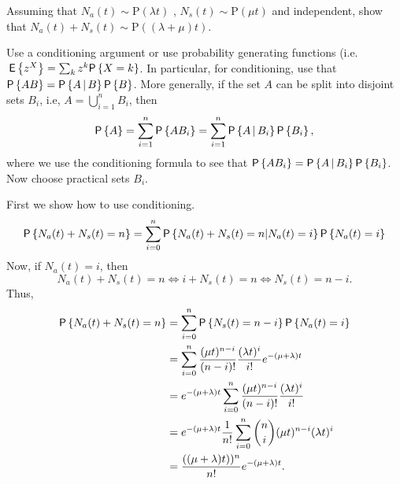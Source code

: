 \begin{question} 
 Assuming that
  $N_a(t)\sim \text{P}(\lambda t)$ , $N_s(t) \sim \text{P}(\mu t)$ and
  independent, show that
  $N_a(t) + N_s(t) \sim \text{P}((\lambda + \mu)t)$. 
  \begin{hint}
Use a conditioning argument or use probability generating
    functions (i.e. $\E{z^X}=\sum_k z^k \P{X=k}$. In particular, for
    conditioning, use that $\P{AB} = \P{A\given B}\P{B}$. More
    generally, if the set $A$ can be split into disjoint sets $B_i$,
    i.e, $A=\bigcup_{i=1}^n B_i$, then
    \begin{equation*}
      \P{A} = \sum_{i=1}^n \P{A B_i} = \sum_{i=1}^n \P{A\given B_i} \P{B_i},
    \end{equation*}
    where we use the conditioning formula to see that
    $\P{A B_i} = \P{A \given B_i} \P{B_i}$.  Now choose practical sets
    $B_i$.  
  \end{hint}

    \begin{solution}
First we show how to  use conditioning. 
  \begin{equation*}
    \begin{split}
\P{N_a(t) + N_s(t) = n} 
&= \sum_{i=0}^n \P{N_a(t) + N_s(t) = n|N_a(t) = i}\P{N_a(t)=i} \\
\end{split}
\end{equation*}
Now, if $N_a(t)=i$, then 
\begin{equation*}
N_a(t)+N_s(t) = n \iff 
i+N_s(t) = n \iff 
N_s(t) = n-i.
\end{equation*}
Thus,
  \begin{equation}\label{eq:002}
    \begin{split}
\P{N_a(t) + N_s(t) = n} 
&= \sum_{i=0}^n \P{ N_s(t) = n-i}\P{N_a(t)=i} \\
&= \sum_{i=0}^n \frac{(\mu t)^{n-i}}{(n-i)!} \frac{(\lambda t)^i}{i!} e^{-(\mu+\lambda)t} \\
&= e^{-(\mu+\lambda)t} \sum_{i=0}^n \frac{(\mu t)^{n-i}}{(n-i)!} \frac{(\lambda t)^i}{i!}  \\
&= e^{-(\mu+\lambda)t}\frac 1{n!} \sum_{i=0}^n {n \choose i }(\mu t)^{n-i}(\lambda t)^i  \\
&= \frac{((\mu+\lambda)t))^n}{n!}e^{-(\mu+\lambda)t}.
    \end{split}
  \end{equation}


\end{solution}
\end{question}

